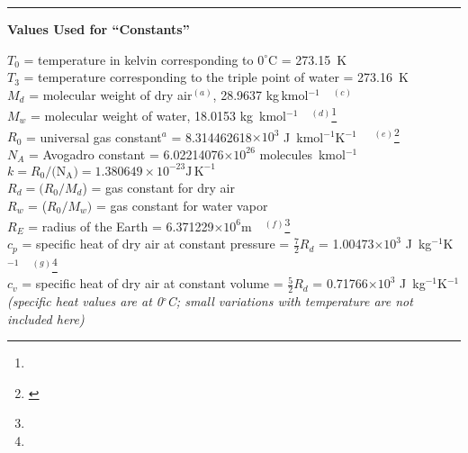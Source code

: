 \documentclass[
]{book}
\begin{document}
\begin{center}\rule{0.5\linewidth}{0.5pt}\end{center}

\textbf{\protect\hypertarget{constants-table}{}{Values Used for ``Constants''}}

\(T_{0}\) = temperature in kelvin corresponding to \(0^{\circ}\)C = 273.15~K\\
\(T_{3}\) = temperature
corresponding to the triple point of water
= 273.16~K\\
\(M_{d}\) = molecular
weight of dry air\(^{(a)}\), 28.9637
kg\(\,\)kmol\(^{-1}\)~~\(^{(c)}\)\\
\(M_{w}\) = molecular
weight of water, 18.0153 kg~kmol\(^{-1}\)~~\(^{(d)}\)\footnote{}\\
\(R_{0}\) = universal
gas constant\(^{a}\)
= 8.314462618\(\times 10^{3}\) J~kmol\(^{-1}\)K\(^{-1}\)~~ \(^{(e)}\)\footnote{\label{fn:2006-CODATA}}\\
\(N_{A}\) = Avogadro constant = 6.02214076\(\times 10^{26}\) molecules~kmol\(^{-1}\)\\
\(k=R_{0}/(\mathrm{N_{A})}=1.380649\times10^{-23}\mathrm{J}\,\mathrm{K}^{-1}\)\\
\(R_{d}=(R_{0}/M_{d}\)) = gas
constant for dry air\\
\(R_{w}\) = (\(R_{0}/M_{w})\) = gas
constant for water vapor\\
\(R_{E}\) = radius of
the Earth = 6.371229\(\times 10^{6}\)m~~\(^{(f)}\)\footnote{}\\
\(c_{p}\) = specific
heat of dry air at constant pressure
= \(\frac{7}{2}R_{d}\) = 1.00473\(\times10^{3}\) J~kg\(^{-1}\)K\(^{-1}\)~~\(^{(g)}\)\footnote{}\\
\(c_{v}\) = specific
heat of dry air at constant volume
= \(\frac{5}{2}R_{d}\) = 0.71766\(\times 10^{3}\) J~kg\(^{-1}\)K\(^{-1}\)\\
\hspace*{0.333em}\hspace*{0.333em}\hspace*{0.333em}\hspace*{0.333em}\hspace*{0.333em}\emph{(specific heat values are at 0\(^{\circ}\)C; small variations
with temperature are not included here)}\\
\end{document}

